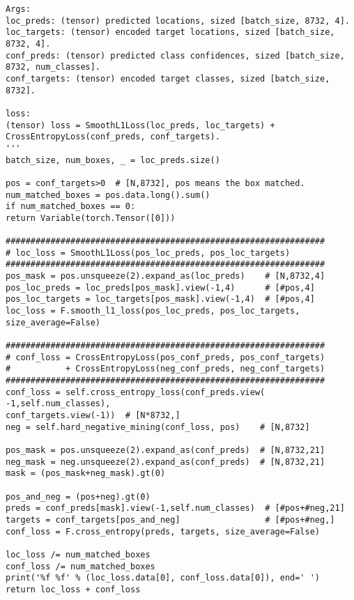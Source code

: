 \begin{lstlisting}
Args:
loc_preds: (tensor) predicted locations, sized [batch_size, 8732, 4].
loc_targets: (tensor) encoded target locations, sized [batch_size, 8732, 4].
conf_preds: (tensor) predicted class confidences, sized [batch_size, 8732, num_classes].
conf_targets: (tensor) encoded target classes, sized [batch_size, 8732].

loss:
(tensor) loss = SmoothL1Loss(loc_preds, loc_targets) + CrossEntropyLoss(conf_preds, conf_targets).
'''
batch_size, num_boxes, _ = loc_preds.size()

pos = conf_targets>0  # [N,8732], pos means the box matched.
num_matched_boxes = pos.data.long().sum()
if num_matched_boxes == 0:
return Variable(torch.Tensor([0]))

################################################################
# loc_loss = SmoothL1Loss(pos_loc_preds, pos_loc_targets)
################################################################
pos_mask = pos.unsqueeze(2).expand_as(loc_preds)    # [N,8732,4]
pos_loc_preds = loc_preds[pos_mask].view(-1,4)      # [#pos,4]
pos_loc_targets = loc_targets[pos_mask].view(-1,4)  # [#pos,4]
loc_loss = F.smooth_l1_loss(pos_loc_preds, pos_loc_targets, size_average=False)

################################################################
# conf_loss = CrossEntropyLoss(pos_conf_preds, pos_conf_targets)
#           + CrossEntropyLoss(neg_conf_preds, neg_conf_targets)
################################################################
conf_loss = self.cross_entropy_loss(conf_preds.view(
-1,self.num_classes), 
conf_targets.view(-1))  # [N*8732,]
neg = self.hard_negative_mining(conf_loss, pos)    # [N,8732]

pos_mask = pos.unsqueeze(2).expand_as(conf_preds)  # [N,8732,21]
neg_mask = neg.unsqueeze(2).expand_as(conf_preds)  # [N,8732,21]
mask = (pos_mask+neg_mask).gt(0)

pos_and_neg = (pos+neg).gt(0)
preds = conf_preds[mask].view(-1,self.num_classes)  # [#pos+#neg,21]
targets = conf_targets[pos_and_neg]                 # [#pos+#neg,]
conf_loss = F.cross_entropy(preds, targets, size_average=False)

loc_loss /= num_matched_boxes
conf_loss /= num_matched_boxes
print('%f %f' % (loc_loss.data[0], conf_loss.data[0]), end=' ')
return loc_loss + conf_loss
\end{lstlisting}
